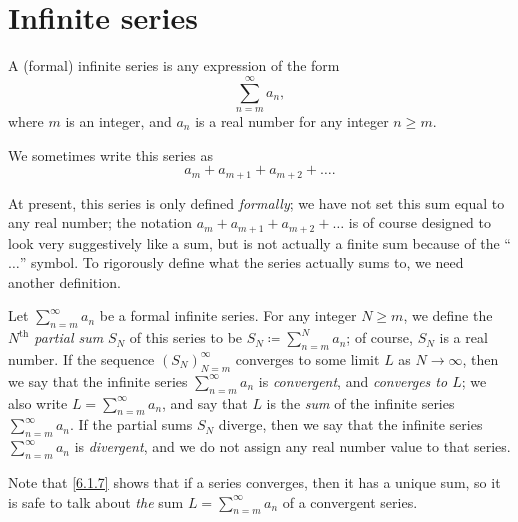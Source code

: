 \section{Infinite series}\label{sec 7.2}

\begin{definition}\label{7.2.1}
  A (formal) infinite series is any expression of the form
  \[
    \sum_{n = m}^\infty a_n,
  \]
  where \(m\) is an integer, and \(a_n\) is a real number for any integer \(n \geq m\).
\end{definition}

\begin{note}
  We sometimes write this series as
  \[
    a_m + a_{m + 1} + a_{m + 2} + \dots.
  \]
\end{note}

\begin{note}
  At present, this series is only defined \emph{formally};
  we have not set this sum equal to any real number;
  the notation \(a_m + a_{m + 1} + a_{m + 2} + \dots\) is of course designed to look very suggestively like a sum, but is not actually a finite sum because of the ``\(\dots\)'' symbol.
  To rigorously define what the series actually sums to, we need another definition.
\end{note}

\begin{definition}\label{7.2.2}
  Let \(\sum_{n = m}^\infty a_n\) be a formal infinite series.
  For any integer \(N \geq m\), we define the \emph{\(N^{\text{th}}\) partial sum} \(S_N\) of this series to be \(S_N \coloneqq \sum_{n = m}^N a_n\);
  of course, \(S_N\) is a real number.
  If the sequence \((S_N)_{N = m}^\infty\) converges to some limit \(L\) as \(N \to \infty\), then we say that the infinite series \(\sum_{n = m}^\infty a_n\) is \emph{convergent}, and \emph{converges to \(L\)};
  we also write \(L = \sum_{n = m}^\infty a_n\), and say that \(L\) is the \emph{sum} of the infinite series \(\sum_{n = m}^\infty a_n\).
  If the partial sums \(S_N\) diverge, then we say that the infinite series \(\sum_{n = m}^\infty a_n\) is \emph{divergent}, and we do not assign any real number value to that series.
\end{definition}

\begin{remark}\label{7.2.3}
  Note that \cref{6.1.7} shows that if a series converges, then it has a unique sum, so it is safe to talk about \emph{the} sum \(L = \sum_{n = m}^\infty a_n\) of a convergent series.
\end{remark}

